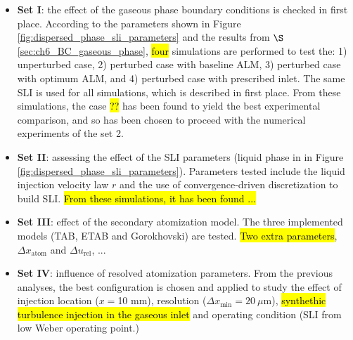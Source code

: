 \begin{itemize}

	\item \textbf{Set I}: the effect of the gaseous phase boundary conditions is checked in first place. According to the parameters shown in Figure \ref{fig:dispersed_phase_sli_parameters} and the results from $\S$\ref{sec:ch6_BC_gaseous_phase}, \hl{four} simulations are performed to test the: 1) unperturbed case, 2) perturbed case with baseline ALM, 3) perturbed case with optimum ALM, and 4) perturbed case with prescribed inlet. The same SLI is used for all simulations, which is described in first place. From these simulations, the case \hl{??} has been found to yield the best experimental comparison, and so has been chosen to proceed with the numerical experiments of the set 2.
	
	\item \textbf{Set II}: assessing the effect of the SLI parameters (liquid phase in in Figure \ref{fig:dispersed_phase_sli_parameters}). Parameters tested include the liquid injection velocity law $r$ and the use of convergence-driven discretization to build SLI. \hl{From these simulations, it has been found ...}
	
	\item \textbf{Set III}: effect of the secondary atomization model. The three implemented models (TAB, ETAB and Gorokhovski) are tested. \hl{Two extra parameters}, $\Delta x_\mathrm{atom}$ and $\Delta u_\mathrm{rel}$, ...
	
	\item \textbf{Set IV}: influence of resolved atomization parameters. From the previous analyses, the best configuration is chosen and applied to study the effect of injection location ($x = $10 mm), resolution ($\Delta x_\mathrm{min} = 20~\mu$m), \hl{synthethic turbulence injection in the gaseous inlet} and operating condition (SLI from low Weber operating point.)

\end{itemize}

\clearpage

